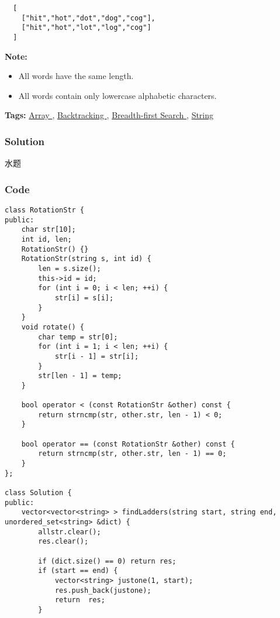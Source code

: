\documentclass{article}
\begin{document}
\begin{CJK*}{UTF8}{gkai}
\begin{verbatim}
  [
    ["hit","hot","dot","dog","cog"],
    ["hit","hot","lot","log","cog"]
  ]
\end{verbatim}

\textbf{Note:}



\begin{itemize}
\item All words have the same length.
\item All words contain only lowercase alphabetic characters.
\end{itemize}


\textbf{Tags: }
\hyperref[ Array ]{ Array },  \hyperref[ Backtracking ]{ Backtracking },  \hyperref[ Breadth-first Search ]{ Breadth-first Search },  \hyperref[ String ]{ String }



\subsubsection*{Solution}
水题

\subsubsection*{Code}
\begin{lstlisting}
class RotationStr {
public:
    char str[10];
    int id, len;
    RotationStr() {}
    RotationStr(string s, int id) {
        len = s.size();
        this->id = id;
        for (int i = 0; i < len; ++i) {
            str[i] = s[i];
        }
    }
    void rotate() {
        char temp = str[0];
        for (int i = 1; i < len; ++i) {
            str[i - 1] = str[i];
        }
        str[len - 1] = temp;
    }
    
    bool operator < (const RotationStr &other) const {
        return strncmp(str, other.str, len - 1) < 0;
    }
    
    bool operator == (const RotationStr &other) const {
        return strncmp(str, other.str, len - 1) == 0;
    }
};

class Solution {
public:
    vector<vector<string> > findLadders(string start, string end, unordered_set<string> &dict) {
        allstr.clear();
        res.clear();
        
        if (dict.size() == 0) return res;
        if (start == end) {
            vector<string> justone(1, start);
            res.push_back(justone);
            return  res;
        }
        

\end{lstlisting}
\end{CJK*}
\end{document}
